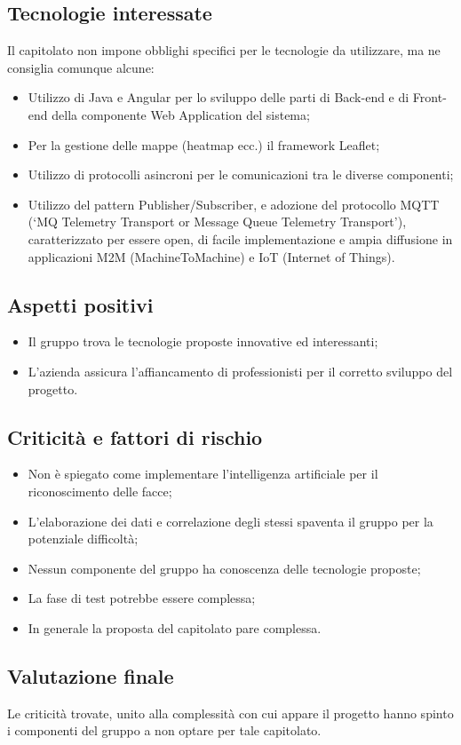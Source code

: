 \subsection{Tecnologie interessate}
Il capitolato non impone obblighi specifici per le tecnologie da utilizzare, ma ne consiglia comunque alcune:
\begin{itemize}
\item Utilizzo di Java e Angular per lo sviluppo delle parti di Back-end e di Front-end della componente Web
Application del sistema;
\item Per la gestione delle mappe (heatmap ecc.) il framework Leaflet;
\item Utilizzo di protocolli asincroni per le comunicazioni tra le diverse componenti;
\item Utilizzo del pattern Publisher/Subscriber, e adozione del protocollo MQTT (‘MQ Telemetry Transport
or Message Queue Telemetry Transport’), caratterizzato per essere open, di facile implementazione
e ampia diffusione in applicazioni M2M (MachineToMachine) e IoT (Internet of Things).
\end{itemize}

\subsection{Aspetti positivi}
\begin{itemize}
\item Il gruppo trova le tecnologie proposte innovative ed interessanti;
\item L'azienda assicura l'affiancamento di professionisti per il corretto sviluppo del progetto.
\end{itemize}

\subsection{Criticità e fattori di rischio}
\begin{itemize}
\item Non è spiegato come implementare l'intelligenza artificiale per il riconoscimento delle facce;
\item L'elaborazione dei dati e correlazione degli stessi spaventa il gruppo per la potenziale difficoltà;
\item Nessun componente del gruppo ha conoscenza delle tecnologie proposte;
\item La fase di test potrebbe essere complessa;
\item In generale la proposta del capitolato pare complessa.
\end{itemize}

\subsection{Valutazione finale}
Le criticità trovate, unito alla complessità con cui appare il progetto hanno spinto i componenti del gruppo a non optare per tale capitolato.
